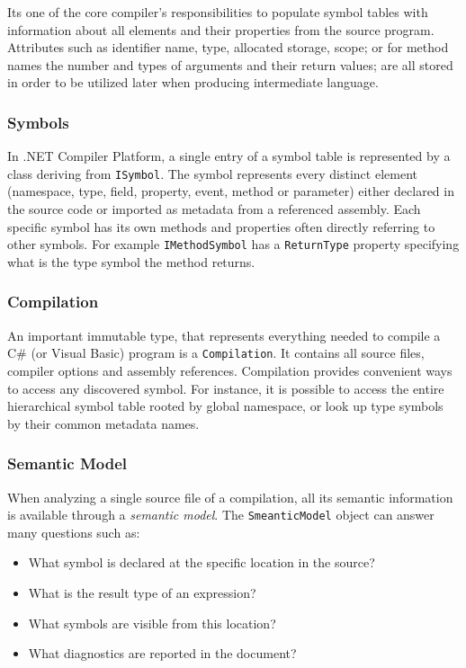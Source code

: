 \documentclass[
  digital, %
  table,   %
  lof,     %
  lot,     %
  oneside,
]{fithesis3}
\begin{document}
Its one of the core compiler's responsibilities to populate symbol tables with information about all elements and their properties from the source program. Attributes such as identifier name, type, allocated storage, scope; or for method names the number and types of arguments and their return values; are all stored in order to be utilized later when producing intermediate language.

\subsubsection{Symbols}
In .NET Compiler Platform, a single entry of a symbol table is represented by a class deriving from \texttt{ISymbol}. The symbol represents every distinct element (namespace, type, field, property, event, method or parameter) either declared in the source code or imported as metadata from a referenced assembly. Each specific symbol has its own methods and properties often directly referring to other symbols. For example \texttt{IMethodSymbol} has a \texttt{ReturnType} property specifying what is the type symbol the method returns.

\subsubsection{Compilation}
An important immutable type, that represents everything needed to compile a C\# (or Visual Basic) program is a \texttt{Compilation}. It contains all source files, compiler options and assembly references. Compilation provides convenient ways to access any discovered symbol. For instance, it is possible to access the entire hierarchical symbol table rooted by global namespace, or look up type symbols by their common metadata names.

\subsubsection{Semantic Model}
When analyzing a single source file of a compilation, all its semantic information is available through a \textit{semantic model}. The \texttt{SmeanticModel} object can answer many questions such as:
  \begin{itemize}
  \item What symbol is declared at the specific location in the source?
  \item What is the result type of an expression?
  \item What symbols are visible from this location?
  \item What diagnostics are reported in the document?
  \end{itemize}
 
\end{document}
